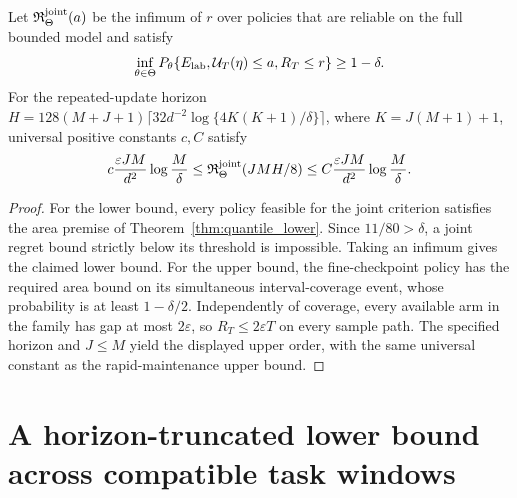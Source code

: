 \begin{corollary}
\label{cor:joint_quantile}
Let $\mathfrak R^{\rm joint}_\Theta(a)$ be the infimum of $r$ over policies
that are reliable on the full bounded model and satisfy
\[
 \inf_{\theta\in\Theta}
 P_\theta\{E_{\rm lab},\mathcal U_T(\eta)\le a,R_T\le r\}\ge1-\delta.
\]
For the repeated-update horizon
$H=128(M+J+1)\lceil32d^{-2}\log\{4K(K+1)/\delta\}\rceil$,
where $K=J(M+1)+1$, universal positive constants $c,C$ satisfy
\[
 c\frac{\varepsilon JM}{d^2}\log\frac M\delta
 \le\mathfrak R^{\rm joint}_\Theta(JMH/8)
 \le C\frac{\varepsilon JM}{d^2}\log\frac M\delta.
\]
\end{corollary}
\begin{proof}
For the lower bound, every policy feasible for the joint criterion satisfies
the area premise of Theorem~\ref{thm:quantile_lower}. Since
$11/80>\delta$, a joint regret bound strictly below its threshold is
impossible. Taking an infimum gives the claimed lower bound.
For the upper bound, the fine-checkpoint policy has the required area bound
on its simultaneous interval-coverage event, whose probability is at least
$1-\delta/2$. Independently of coverage, every available arm in the family has
gap at most $2\varepsilon$, so $R_T\le2\varepsilon T$ on every sample path.
The specified horizon and $J\le M$ yield the displayed upper order, with the
same universal constant as the rapid-maintenance upper bound.
\end{proof}

\section{A horizon-truncated lower bound across compatible task windows}
\label{sec:truncated_extension}

